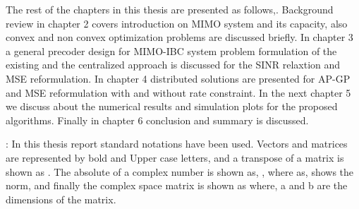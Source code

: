 The rest of the chapters in this thesis are presented as follows,. Background review in chapter 2 covers introduction on \ac{MIMO} system and its capacity, also convex and non convex optimization problems are discussed briefly. In chapter 3 a general precoder design for \ac{MIMO}-\ac{IBC} system problem formulation of the existing and the centralized approach is discussed for the \ac{SINR} relaxtion and \ac{MSE} reformulation. In chapter 4 distributed solutions are presented for \ac{AP-GP} and \ac{MSE} reformulation with and without rate constraint. In the next chapter 5 we discuss about the numerical results and simulation plots for the proposed algorithms. Finally in chapter 6 conclusion and summary is discussed.


: In this thesis report standard notations have been used. Vectors and matrices are represented by bold and Upper case letters, and a transpose of a matrix is shown as . The absolute of a complex number is shown as, , where as,  shows the  norm, and finally the complex space matrix is shown as  where, a and b are the dimensions of the matrix. 
